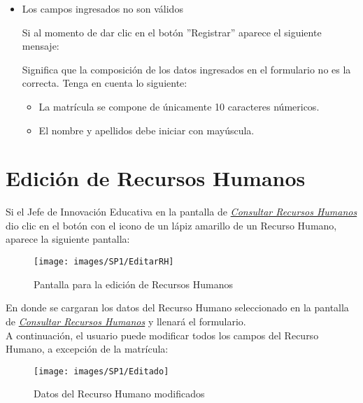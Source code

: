 \begin{itemize}
            	\item Los campos ingresados no son válidos
    
                	Si al momento de dar clic en el botón ''Registrar'' aparece el siguiente mensaje:
            
                	Significa que la composición de los datos ingresados en el formulario no es la correcta. Tenga en cuenta lo siguiente:
            
                	\begin{itemize}
                		\item La matrícula se compone de únicamente 10 caracteres númericos.
                		\item El nombre y apellidos debe iniciar con mayúscula.
                	\end{itemize}
            
            \end{itemize}

\newpage
    \section{Edición de Recursos Humanos}
        Si el Jefe de Innovación Educativa en la pantalla de \hyperlink{consultarrh}{\textit{Consultar Recursos Humanos}} dio clic en el botón con el icono de un lápiz amarillo de un Recurso Humano, aparece la siguiente pantalla:
        
        \begin{figure}[!hbtp]
        	\centering
        	\hypertarget{editarrh}{\texttt{[image: images/SP1/EditarRH]}}
        	\caption{Pantalla para la edición de Recursos Humanos}
        	\label{editarrh}
        \end{figure}

        En donde se cargaran los datos del Recurso Humano seleccionado en la pantalla de \hyperlink{consultarrh}{\textit{Consultar Recursos Humanos}} y llenará el formulario.\\
        
        A continuación, el usuario puede modificar todos los campos del Recurso Humano, a excepción de la matrícula:
        \begin{figure}[!hbtp]
        	\centering
        	\hypertarget{modif}{\texttt{[image: images/SP1/Editado]}}
        	\caption{Datos del Recurso Humano modificados}
        	\label{modif}
        \end{figure}

